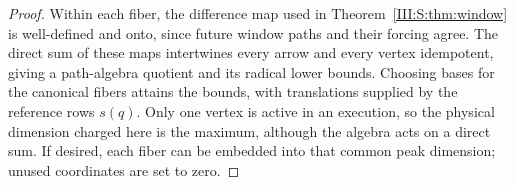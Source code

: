 \begin{proof}
Within each fiber, the difference map used in Theorem~\ref{III:S:thm:window} is well-defined and onto, since future window paths and their forcing agree. The direct sum of these maps intertwines every arrow and every vertex idempotent, giving a path-algebra quotient and its radical lower bounds. Choosing bases for the canonical fibers attains the bounds, with translations supplied by the reference rows $s(q)$. Only one vertex is active in an execution, so the physical dimension charged here is the maximum, although the algebra acts on a direct sum. If desired, each fiber can be embedded into that common peak dimension; unused coordinates are set to zero.
\end{proof}

